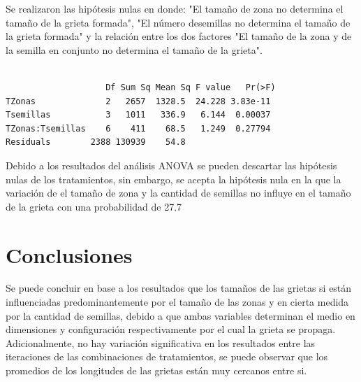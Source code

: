 \documentclass{article}
\begin{document}
Se realizaron las hipótesis nulas en donde: "El tamaño de zona no determina el tamaño de la grieta formada", "El número desemillas no determina el tamaño de la grieta formada" y la relación entre los dos factores "El tamaño de la zona y de la semilla en conjunto no determina el tamaño de la grieta".

\begin{lstlisting}

                    Df Sum Sq Mean Sq F value   Pr(>F)    
TZonas              2   2657  1328.5  24.228 3.83e-11 
Tsemillas           3   1011   336.9   6.144  0.00037 
TZonas:Tsemillas    6    411    68.5   1.249  0.27794   
Residuals        2388 130939    54.8   
\end{lstlisting}

Debido a los resultados del análisis ANOVA se pueden descartar las hipótesis nulas de los tratamientos, sin embargo, se acepta la hipótesis nula en la que la variación de el tamaño de zona y la cantidad de semillas no influye en el tamaño de la grieta con una probabilidad de 27.7%


\section{Conclusiones}
Se puede concluir en base a los resultados que los tamaños de las grietas si están influenciadas predominantemente por el tamaño de las zonas y en cierta medida por la cantidad de semillas, debido a que ambas variables determinan el medio en dimensiones y configuración respectivamente por el cual la grieta se propaga. Adicionalmente, no hay variación significativa en los resultados entre las iteraciones de las combinaciones de tratamientos, se puede observar que los promedios de los longitudes de las grietas están muy cercanos entre si.











\end{document}
